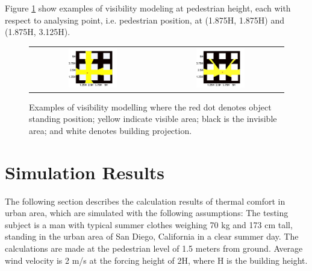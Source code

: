 \documentclass[smallextended]{svjour3}
\begin{document}
Figure \ref{Fig.VisibilityExample} show examples of visibility modeling at pedestrian height, each with respect to analysing point, i.e. pedestrian position, at (1.875H, 1.875H) and (1.875H, 3.125H).
\begin{figure}[H]
\centering  
\graphicspath{ {image/} }
\begin{tabular}{cc}
\includegraphics[width=0.4\textwidth]{VisibilityTestExampleOne.jpg}   &
\includegraphics[width=0.4\textwidth]{VisibilityTestExampleTwo.jpg}
\end{tabular}
\caption{Examples of visibility modelling where the red dot denotes object standing position; yellow indicate visible area; black is the invisible area;  and white denotes building projection. }
\label{Fig.VisibilityExample}
\end{figure}



\section{Simulation Results}
\label{sec:res} 
The following section describes the calculation results of thermal comfort in urban area, which are simulated with the following assumptions: The testing subject is a man with typical summer clothes weighing 70 kg and 173 cm tall, standing  in the urban area of San Diego, California in a clear summer day. The calculations are made at the pedestrian level of 1.5 meters from ground. Average wind velocity is 2 m/s at the forcing height of 2H, where H is the building height. 
\end{document}
